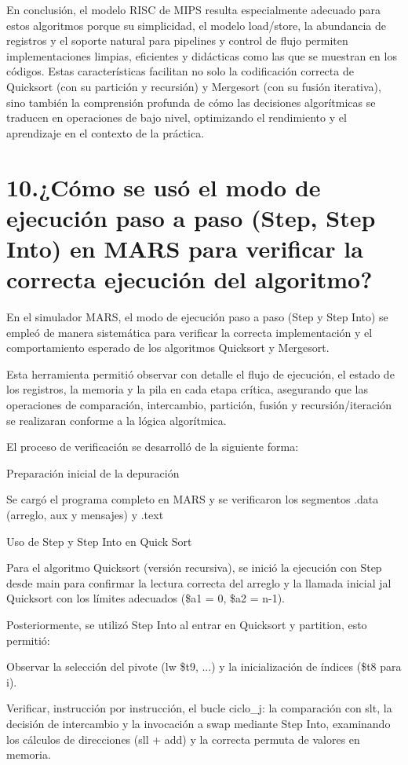 \documentclass[12pt, letterpaper]{article}
\begin{document}
En conclusión, el modelo RISC de MIPS resulta especialmente adecuado para estos algoritmos porque su simplicidad, el modelo load/store, la abundancia de registros y el soporte natural para pipelines y control de flujo permiten implementaciones limpias, eficientes y didácticas como las que se muestran en los códigos. Estas características facilitan no solo la codificación correcta de Quicksort (con su partición y recursión) y Mergesort (con su fusión iterativa), sino también la comprensión profunda de cómo las decisiones algorítmicas se traducen en operaciones de bajo nivel, optimizando el rendimiento y el aprendizaje en el contexto de la práctica.\newpage

\section*{10.¿Cómo se usó el modo de ejecución paso a paso (Step, Step Into) en MARS para verificar la correcta ejecución del algoritmo?}

En el simulador MARS, el modo de ejecución paso a paso (Step y Step Into) se empleó de manera sistemática para verificar la correcta implementación y el comportamiento esperado de los algoritmos Quicksort y Mergesort. 

Esta herramienta permitió observar con detalle el flujo de ejecución, el estado de los registros, la memoria y la pila en cada etapa crítica, asegurando que las operaciones de comparación, intercambio, partición, fusión y recursión/iteración se realizaran conforme a la lógica algorítmica.

El proceso de verificación se desarrolló de la siguiente forma:

Preparación inicial de la depuración

Se cargó el programa completo en MARS y se verificaron los segmentos .data (arreglo, aux y mensajes) y .text

 Uso de Step y Step Into en Quick Sort

Para el algoritmo Quicksort (versión recursiva), se inició la ejecución con Step desde main para confirmar la lectura correcta del arreglo y la llamada inicial jal Quicksort  con los límites adecuados (\$a1 = 0, \$a2 = n-1). 

Posteriormente, se utilizó Step Into al entrar en Quicksort  y partition, esto permitió:

Observar la selección del pivote (lw \$t9, ...) y la inicialización de índices (\$t8 para i).

Verificar, instrucción por instrucción, el bucle ciclo\_j: la comparación con slt, la decisión de intercambio y la invocación a swap mediante Step Into, examinando los cálculos de direcciones (sll + add) y la correcta permuta de valores en memoria.
\end{document}
